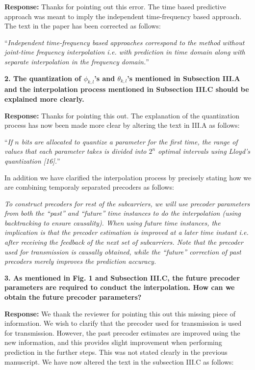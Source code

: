 \documentclass[12pt]{letter}
\begin{document}
\textbf{Response:} Thanks for pointing out this error. The time based
predictive approach was meant to imply the independent time-frequency based
approach. The text in the paper has been corrected as follows:


``\emph{Independent time-frequency based approaches correspond to the
  method without joint-time frequency interpolation i.e. with
  prediction in time domain along with separate interpolation in the frequency
  domain.}''

\textbf{2. The quantization of $\phi_{k,l}$'s and $\theta_{k,l}$'s mentioned in Subsection III.A and the interpolation
process mentioned in Subsection III.C should be explained more clearly.}

\textbf{Response:}
Thanks for pointing this out. The explanation of the quantization
process has now been made more  clear by altering the text in III.A as
follows:

``\emph{If $n$ bits are allocated to quantize a parameter
for the first time, the range of values that each parameter takes is
divided into $2^n$ optimal intervals using Lloyd's
quantization [16].}''

In addition we have clarified the interpolation process by precisely stating
how we are combining temporaly separated precoders as follows:
 
\emph{To construct precoders for rest of the subcarriers, we will use
precoder parameters from both the ``past'' and ``future'' time
instances to do the interpolation (using backtracking to ensure
causality). When using future time instances, the implication is that the precoder
estimation is improved at a later time instant i.e. after receiving
the feedback of the next set of subcarriers. Note that the precoder
used for transmission is causally obtained, while the ``future''
correction of past precoders merely improves the prediction
accuracy.}

\textbf{3. As mentioned in Fig. 1 and Subsection III.C, the future
  precoder parameters are required to conduct the interpolation. How
  can we obtain the future precoder parameters?}

\textbf{Response:} We thank the reviewer for pointing this out this
missing piece of information. We
wish to clarify that the precoder used for transmission is used for
transmission. However, the past precoder estimates are improved using
the new information, and this provides slight improvement when
performing prediction in the further steps. This was not stated
clearly in the previous manuscript. We have now altered the text in the subsection III.C as follows:
\end{document}

